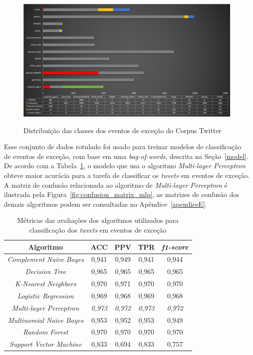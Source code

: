 \documentclass[
	12pt,				%
	oneside,			%
	a4paper,			%
	english,			%
	brazil				%
	]{abntex2ppgsi}
\begin{document}
{{{\begin{figure}[!htb]
	\centering
 	  \caption{Distribuição das classes dos eventos de exceção do Corpus Twitter}
		\includegraphics[width=1\linewidth]{images/tweets_distribution_pt.png}
	\label{fig:tweets_distribution}
\end{figure}

Esse conjunto de dados rotulado foi usado para treinar modelos de classificação de eventos de exceção, com base em uma \textit{bag-of-words}, descrita na Seção~\ref{model}. De acordo com a Tabela~\ref{tab:metrics}, o modelo que usa o algoritmo \textit{Multi-layer Perceptron} obteve maior acurácia para a tarefa de classificar os \textit{tweets} em eventos de exceção. A matriz de confusão relacionada ao algoritmo de \textit{Multi-layer Perceptron} é ilustrada pela Figura~\ref{fig:confusion_matrix_mlp}, as matrizes de confusão dos demais algoritmos podem ser consultadas no Apêndice~\ref{apendiceE}.

\begin{table}[!htb]
\centering
\caption {Métricas das avaliações dos algoritmos utilizados para classificação dos \textit{tweets} em eventos de exceção}
\label {tab:metrics}
\begin{tabular}{c|c|c|c|c}
\toprule
\textbf{Algoritmo} & \textbf{ACC} & \textbf{PPV} & \textbf{TPR} & \textbf{\textit{f1-score}} \\
\midrule
\textit{Complement Naive Bayes} & 0,941 & 0,949 & 0,941 & 0,944 \\
\hline
\textit{Decision Tree} & 0,965 & 0,965 & 0,965 & 0,965 \\
\hline
\textit{K-Nearest Neighbors} & 0,970 & 0,971 & 0,970 & 0,970 \\
\hline
\textit{Logistic Regression} & 0,969 & 0,968 & 0,969 & 0,968 \\
\hline
\textit{Multi-layer Perceptron} & \textit{0,973} & \textit{0,972} & \textit{0,973} & \textit{0,972} \\
\hline
\textit{Multinomial Naive Bayes} & 0,953 & 0,952 & 0,953 & 0,949 \\
\hline
\textit{Random Forest} & 0,970 & 0,970 & 0,970 & 0,970 \\
\hline
\textit{Support Vector Machine} & 0,833 & 0,694 & 0,833 & 0,757 \\
\bottomrule
\end{tabular}\end{table}


}}}
\end{document}
